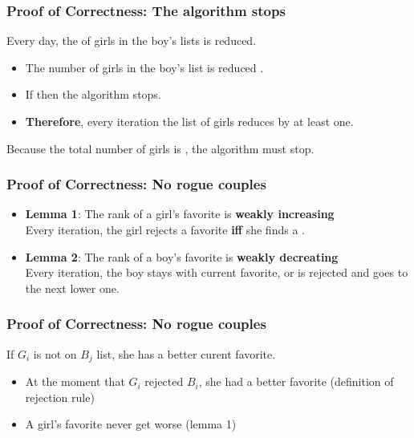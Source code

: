 \documentclass{beamer}
\begin{document}
\begin{frame}
  \frametitle{Proof of Correctness: The algorithm stops}

  {\larger
    Every day, the  of girls in
    the boy's lists is reduced.

    \bigskip
    
    \begin{itemize}
    \item The number of girls in the boy's list is reduced
      .
    \item If  then the algorithm stops.
    \item {\bf Therefore}, every iteration the list of girls reduces
      by at least one.
    \end{itemize}

    \bigskip
    
    Because the total number of girls is , the algorithm \alert{must stop}.
  }
\end{frame}

\begin{frame}
  \frametitle{Proof of Correctness: No rogue couples}

  {\larger

    \begin{itemize}
    \item {\bf Lemma 1}: The rank of a girl's favorite is {\bf weakly
      increasing}\\ Every iteration, the girl rejects a favorite {\bf
      iff} she finds a .

      \bigskip
      
    \item {\bf Lemma 2}: The rank of a boy's favorite is {\bf weakly
      decreating}\\ Every iteration, the boy stays with current
      favorite, or is rejected and goes to the next lower one.
      
    \end{itemize}
  }
\end{frame}

\begin{frame}
  \frametitle{Proof of Correctness: No rogue couples}

  { If $G_i$ is not on $B_j$ list, she has a
    better curent favorite.

    \bigskip
    
    \begin{itemize}
    \item At the moment that $G_i$ rejected $B_i$, she had a better
      favorite (definition of rejection rule)

      \bigskip

    \item A girl's favorite never get worse (lemma 1)
    \end{itemize}    
  }
\end{frame}
\end{document}
